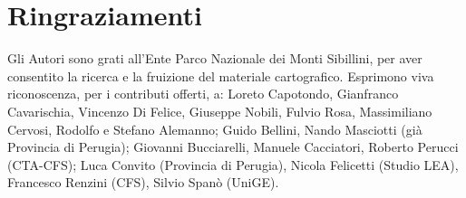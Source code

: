 \section*{Ringraziamenti}

Gli Autori sono grati all{\textquoteright}Ente Parco Nazionale dei Monti
Sibillini, per aver consentito la ricerca e la fruizione del materiale
cartografico. Esprimono viva riconoscenza, per i contributi offerti, a:
Loreto Capotondo, Gianfranco Cavarischia, Vincenzo Di Felice, Giuseppe
Nobili, Fulvio Rosa, Massimiliano Cervosi, Rodolfo e Stefano Alemanno;
Guido Bellini, Nando Masciotti (gi\`a Provincia di Perugia); Giovanni
Bucciarelli, Manuele Cacciatori, Roberto Perucci (CTA-CFS); Luca
Convito (Provincia di Perugia), Nicola Felicetti (Studio LEA),
Francesco Renzini (CFS), Silvio Span\`o (UniGE).

